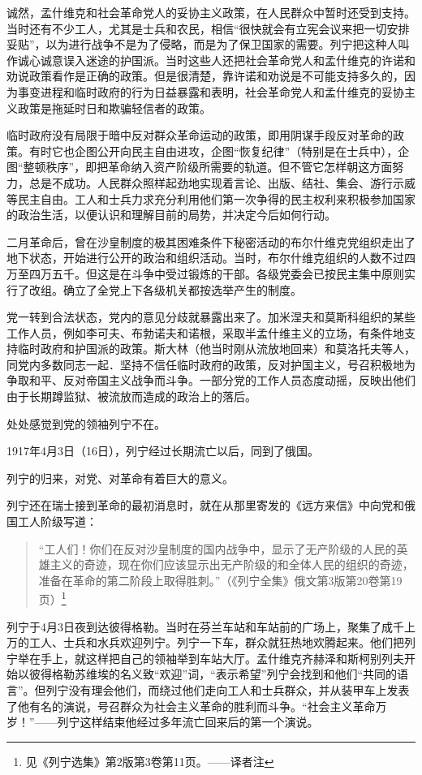 诚然，孟什维克和社会革命党人的妥协主义政策，在人民群众中暂时还受到支持。当时还有不少工人，尤其是士兵和农民，相信“很快就会有立宪会议来把一切安排妥贴”，以为进行战争不是为了侵略，而是为了保卫国家的需要。列宁把这种人叫作诚心诚意误入迷途的护国派。当时这些人还把社会革命党人和孟什维克的许诺和劝说政策看作是正确的政策。但是很清楚，靠许诺和劝说是不可能支持多久的，因为事变进程和临时政府的行为日益暴露和表明，社会革命党人和孟什维克的妥协主义政策是拖延时日和欺骗轻信者的政策。

临时政府没有局限于暗中反对群众革命运动的政策，即用阴谋手段反对革命的政策。有时它也企图公开向民主自由进攻，企图“恢复纪律”（特别是在士兵中），企图“整顿秩序”，即把革命纳入资产阶级所需要的轨道。但不管它怎样朝这方面努力，总是不成功。人民群众照样起劲地实现着言论、出版、结社、集会、游行示威等民主自由。工人和士兵力求充分利用他们第一次争得的民主权利来积极参加国家的政治生活，以便认识和理解目前的局势，并决定今后如何行动。

二月革命后，曾在沙皇制度的极其困难条件下秘密活动的布尔什维克党组织走出了地下状态，开始进行公开的政治和组织活动。当时，布尔什维克组织的人数不过四万至四万五千。但这是在斗争中受过锻炼的干部。各级党委会已按民主集中原则实行了改组。确立了全党上下各级机关都按选举产生的制度。

党一转到合法状态，党内的意见分歧就暴露出来了。加米涅夫和莫斯科组织的某些工作人员，例如李可夫、布勃诺夫和诺根，采取半孟什维主义的立场，有条件地支持临时政府和护国派的政策。斯大林（他当时刚从流放地回来）和莫洛托夫等人，同党内多数同志一起．坚持不信任临时政府的政策，反对护国主义，号召积极地为争取和平、反对帝国主义战争而斗争。一部分党的工作人员态度动摇，反映出他们由于长期蹲监狱、被流放而造成的政治上的落后。

处处感觉到党的领袖列宁不在。

1917年4月3日（16日），列宁经过长期流亡以后，同到了俄国。

列宁的归来，对党、对革命有着巨大的意义。

列宁还在瑞士接到革命的最初消息时，就在从那里寄发的《远方来信》中向党和俄国工人阶级写道：

\begin{quotation}
“工人们！你们在反对沙皇制度的国内战争中，显示了无产阶级的人民的英雄主义的奇迹，现在你们应该显示出无产阶级的和全体人民的组织的奇迹，准备在革命的第二阶段上取得胜刺。”（《列宁全集》俄文第3版第20卷第19页）\footnote{见《列宁选集》第2版第3卷第11页。——译者注}
\end{quotation}

列宁于4月3日夜到达彼得格勒。当时在芬兰车站和车站前的广场上，聚集了成千上万的工人、士兵和水兵欢迎列宁。列宁一下车，群众就狂热地欢腾起来。他们把列宁举在手上，就这样把自己的领袖举到车站大厅。孟什维克齐赫泽和斯柯别列夫开始以彼得格勒苏维埃的名义致“欢迎”词，“表示希望”列宁会找到和他们“共同的语言”。但列宁没有理会他们，而绕过他们走向工人和士兵群众，并从装甲车上发表了他有名的演说，号召群众为社会主义革命的胜利而斗争。“社会主义革命万岁！”——列宁这样结束他经过多年流亡回来后的第一个演说。


